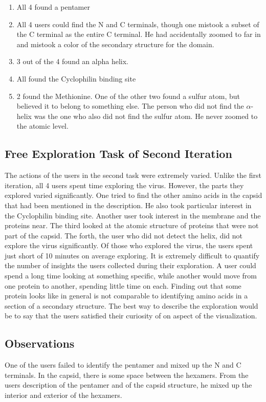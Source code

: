 \documentclass[review,journal]{vgtc}         %
\begin{document}
\begin{enumerate}
	\item All 4 found a pentamer
	\item All 4 users could find the N and C terminals, though one mistook a subset of the C terminal as the entire C terminal. He had accidentally zoomed to far in and mistook a color of the secondary structure for the domain.
	\item 3 out of the 4 found an alpha helix.
	\item All found the Cyclophilin binding site
	\item 2 found the Methionine. One of the other two found a sulfur atom, but believed it to belong to something else. The person who did not find the $\alpha$-helix was the one who also did not find the sulfur atom. He never zoomed to the atomic level.
\end{enumerate}


\subsection{Free Exploration Task of Second Iteration}

The actions of the users in the second task were extremely varied. 
Unlike the first iteration, all 4 users spent time exploring the virus. 
However, the parts they explored varied significantly. 
One tried to find the other amino acids in the capsid that had been mentioned in the description. 
He also took particular interest in the Cyclophilin binding site. 
Another user took interest in the membrane and the proteins near. 
The third looked at the atomic structure of proteins that were not part of the capsid. 
The forth, the user who did not detect the helix, did not explore the virus significantly.
Of those who explored the virus, the users spent just short of 10 minutes on average exploring.
It is extremely difficult to quantify the number of insights the users collected during their exploration.
A user could spend a long time looking at something specific, while another would move from one protein to another, spending little time on each.
Finding out that some protein looks like in general is not comparable to identifying amino acids in a section of a secondary structure.
The best way to describe the exploration would be to say that the users satisfied their curiosity of on aspect of the visualization.




\subsection{Observations}
One of the users failed to identify the pentamer and mixed up the N and C terminals. 
In the capsid, there is some space between the hexamers. 
From the users description of the pentamer and of the capsid structure, he mixed up the interior and exterior of the hexamers. 
\end{document}
